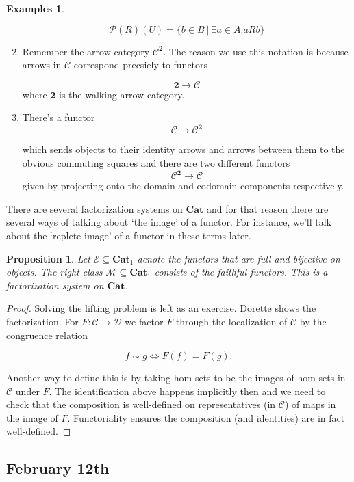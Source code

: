 \documentclass[11pt]{amsart}
\theoremstyle{plain}
\newtheorem{prop}[thm]{Proposition}
\theoremstyle{definition}
\newtheorem*{egs*}{Examples}
\newcommand{\cP}{{\mathcal P}}
\newcommand{\cC}{{\mathcal C}}
\newcommand{\cD}{{\mathcal D}}
\newcommand{\cE}{{\mathcal E}}
\newcommand{\cM}{{\mathcal M}}
\newcommand{\Cat}{\mathbf{Cat}}
\newcommand{\noi}{{\noindent}}
\begin{document}
\begin{egs*}
\begin{enumerate}
\[ \cP(R) (U) = \{ b \in B \ | \ \exists a \in A . a R b \} \]\medskip 

\item Remember the arrow category $\cC^{\mathbf{2}}$. The reason we use this notation is because arrows in $\cC$ correspond precsiely to functors 

\[ \mathbf{2} \to \cC \]
\noi where $\mathbf{2}$ is the walking arrow category. \medskip

\item There's a functor
\[ \cC \to \cC^\mathbf{2} \]

\noi which sends objects to their identity arrows and arrows between them to the obvious commuting squares and there are two different functors 
\[ \cC^\mathbf{2} \to \cC \]
\noi given by projecting onto the domain and codomain components respectively. 
\end{enumerate}
\end{egs*}

There are several factorization systems on $\Cat$ and for that reason there are several ways of talking about `the image' of a functor. For instance, we'll talk about the `replete image' of a functor in these terms later. 

\begin{prop}
Let $\cE \subseteq \Cat_1$ denote the functors that are full and bijective on objects. The right class $\cM \subseteq \Cat_1$ consists of the faithful functors. This is a factorization system on $\Cat$. 
\end{prop}
\begin{proof}
Solving the lifting problem is left as an exercise. Dorette shows the factorization. For $F : \cC \to \cD$ we factor $F$ through the localization of $\cC$ by the congruence relation 

\[ f \sim g \iff F(f) = F(g).\]

\noi Another way to define this is by taking hom-sets to be the images of hom-sets in $\cC$ under $F$. The identification above happens implicitly then and we need to check that the composition is well-defined on representatives (in $\cC$) of maps in the image of $F$. Functoriality ensures the composition (and identities) are in fact well-defined.
\end{proof}



\subsection{February 12th}
\end{document}
